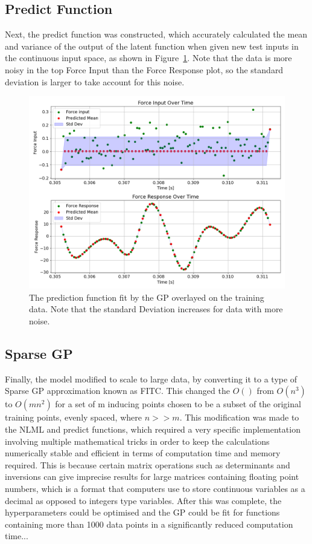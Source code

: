 \documentclass[12pt]{article}
\begin{document}
    \subsection{Predict Function}
    Next, the predict function was constructed, which accurately calculated the mean and variance of the output of the latent function when given new test inputs in the continuous input space, as shown in Figure~\ref{fig:input-response-predict}.
    Note that the data is more noisy in the top Force Input than the Force Response plot, so the standard deviation is larger to take account for this noise.

    \begin{figure}[ht]
        \centering
        \includegraphics[width=1.0\linewidth]{figures/input-response-predict/input-response-predict.png}
        \caption{The prediction function fit by the GP overlayed on the training data. Note that the standard Deviation increases for data with more noise.}
        \label{fig:input-response-predict}
    \end{figure}

    \subsection{Sparse GP}
    Finally, the model modified to scale to large data, by converting it to a type of Sparse GP approximation known as FITC.
    This changed the $O()$ from $O(n^3)$ to $O(mn^2)$ for a set of m inducing points chosen to be a subset of the original training points, evenly spaced, where $n >> m$.
    This modification was made to the NLML and predict functions, which required a very specific implementation involving multiple mathematical tricks in order to keep the calculations numerically stable and efficient in terms of computation time and memory required.
    This is because certain matrix operations such as determinants and inversions can give imprecise results for large matrices containing floating point numbers, which is a format that computers use to store continuous variables as a decimal as opposed to integers type variables.
    After this was complete, the hyperparameters could be optimised and the GP could be fit for functions containing more than 1000 data points in a significantly reduced computation time... %
\end{document}
